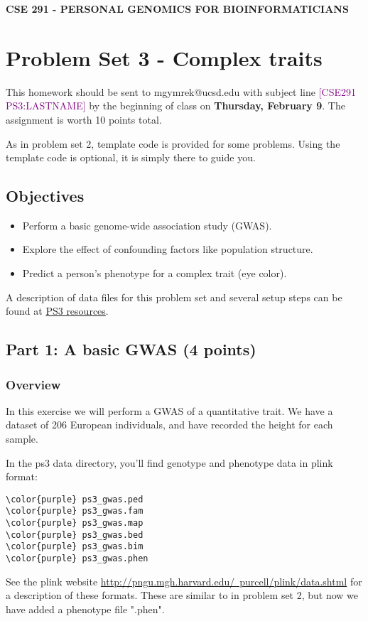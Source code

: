 \documentclass[12pt]{article}
\begin{document}
\textbf{CSE 291 - PERSONAL GENOMICS FOR BIOINFORMATICIANS}

\section*{Problem Set 3 - Complex traits}

This homework should be sent to mgymrek@ucsd.edu with subject line \textcolor{purple}{[CSE291 PS3:LASTNAME]} by the beginning of class on \textbf{Thursday, February 9}. The assignment is worth 10 points total.

As in problem set 2, template code is provided for some problems. Using the template code is optional, it is simply there to guide you.

\subsection*{Objectives}
\begin{itemize}
\item Perform a basic genome-wide association study (GWAS).
\item Explore the effect of confounding factors like population structure.
\item Predict a person's phenotype for a complex trait (eye color).
\end{itemize}

A description of data files for this problem set and several setup steps can be found at \href{https://gymreklab.github.io/teaching/personal\_genomics/ps3\_resources.html}{PS3 resources}. 

\subsection*{Part 1: A basic GWAS (4 points)}

\subsubsection*{Overview}

In this exercise we will perform a GWAS of a quantitative trait. We have a dataset of 206 European individuals, and have recorded the height for each sample.

In the ps3 data directory, you'll find genotype and phenotype data in plink format:  
\begin{Verbatim}[commandchars=\\\{\}]
\color{purple} ps3_gwas.ped
\color{purple} ps3_gwas.fam
\color{purple} ps3_gwas.map
\color{purple} ps3_gwas.bed
\color{purple} ps3_gwas.bim
\color{purple} ps3_gwas.phen
\end{Verbatim}
See the plink website \href{http://pngu.mgh.harvard.edu/~purcell/plink/data.shtml}{http://pngu.mgh.harvard.edu/~purcell/plink/data.shtml} for a description of these formats. These are similar to in problem set 2, but now we have added a phenotype file ".phen".
\end{document}
